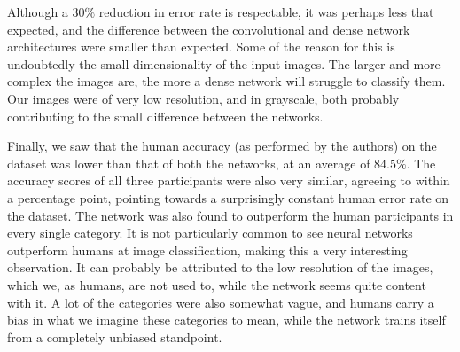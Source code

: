 \documentclass[10pt, twocolumn]{article}
\begin{document}
Although a $30\%$ reduction in error rate is respectable, it was perhaps less that expected, and the difference between the convolutional and dense network architectures were smaller than expected. Some of the reason for this is undoubtedly the small dimensionality of the input images. The larger and more complex the images are, the more a dense network will struggle to classify them. Our images were of very low resolution, and in grayscale, both probably contributing to the small difference between the networks.

Finally, we saw that the human accuracy (as performed by the authors) on the dataset was lower than that of both the networks, at an average of $84.5\%$. The accuracy scores of all three participants were also very similar, agreeing to within a percentage point, pointing towards a surprisingly constant human error rate on the dataset. The network was also found to outperform the human participants in every single category. It is not particularly common to see neural networks outperform humans at image classification, making this a very interesting observation. It can probably be attributed to the low resolution of the images, which we, as humans, are not used to, while the network seems quite content with it. A lot of the categories were also somewhat vague, and humans carry a bias in what we imagine these categories to mean, while the network trains itself from a completely unbiased standpoint.

\end{document}
